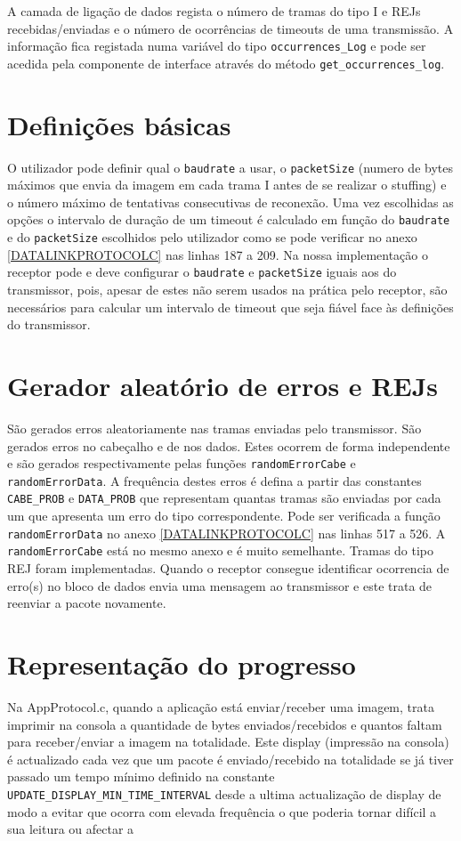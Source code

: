 \documentclass[11pt,a4paper,reqno]{report}
\numberwithin{equation}{section}
\begin{document}
A camada de ligação de dados regista o número de tramas do tipo I e REJs recebidas/enviadas e o número de ocorrências de timeouts de uma transmissão. A informação fica registada numa variável do tipo \verb|occurrences_Log| e pode ser acedida pela componente de interface através do método \verb|get_occurrences_log|.

\section{Definições básicas}

O utilizador pode definir qual o \verb|baudrate| a usar, o \verb|packetSize| (numero de bytes máximos que envia da imagem em cada trama I antes de se realizar o stuffing) e o número máximo de tentativas consecutivas de reconexão.
Uma vez escolhidas as opções o intervalo de duração de um timeout é calculado em função do \verb|baudrate| e do \verb|packetSize| escolhidos pelo utilizador como se pode verificar no anexo \ref{DATALINKPROTOCOLC} nas linhas 187 a 209. Na nossa implementação o receptor pode e deve configurar o \verb|baudrate| e \verb|packetSize| iguais aos do transmissor, pois, apesar de estes não serem usados na prática pelo receptor, são necessários para calcular um intervalo de timeout que seja fiável face às definições do transmissor.

\section{Gerador aleatório de erros e REJs}
São gerados erros aleatoriamente nas tramas enviadas pelo transmissor. São gerados erros no cabeçalho e de nos dados. Estes ocorrem de forma independente e são gerados respectivamente pelas funções \verb|randomErrorCabe| e \verb|randomErrorData|. A frequência destes erros é defina a partir das constantes \verb|CABE_PROB| e \verb|DATA_PROB| que representam quantas tramas são enviadas por cada um que apresenta um erro do tipo correspondente. Pode ser verificada a função \verb|randomErrorData| no anexo \ref{DATALINKPROTOCOLC} nas linhas 517 a 526. A \verb|randomErrorCabe| está no mesmo anexo e é muito semelhante.
Tramas do tipo REJ foram implementadas. Quando o receptor consegue identificar ocorrencia de erro(s) no bloco de dados envia uma mensagem ao transmissor e este trata de reenviar a pacote novamente.

\section{Representação do progresso}
Na AppProtocol.c, quando a aplicação está enviar/receber uma imagem, trata imprimir na consola a quantidade de bytes enviados/recebidos e quantos faltam para receber/enviar a imagem na totalidade. Este display (impressão na consola) é actualizado cada vez que um pacote é enviado/recebido na totalidade se já tiver passado um tempo mínimo definido na constante \verb|UPDATE_DISPLAY_MIN_TIME_INTERVAL| desde a ultima actualização de display de modo a evitar que ocorra com elevada frequência o que poderia tornar difícil a sua leitura ou afectar a
\end{document}
